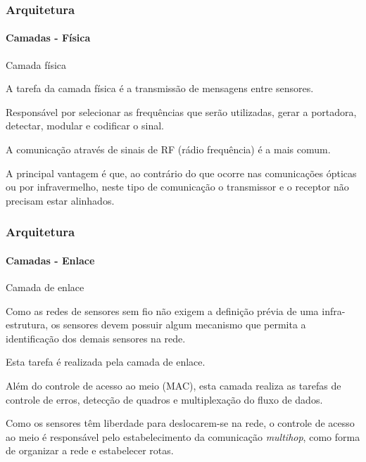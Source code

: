 \documentclass[notes]{beamer}
\begin{document}
\begin{frame}
\label{slide_42}
\frametitle{Arquitetura}
\framesubtitle{Camadas - Física}

\begin{block}{Camada física}

A tarefa da camada física é a transmissão de mensagens entre sensores.

\end{block} \pause

\begin{block}

Responsável por selecionar as frequências que serão utilizadas, gerar a portadora, detectar, modular e codificar o sinal. 

\end{block} \pause

\begin{block}

A comunicação através de sinais de RF (rádio frequência) é a mais comum. 
\end{block} \pause

\begin{block}

A principal vantagem é que, ao contrário do que ocorre nas comunicações ópticas ou por infravermelho, neste tipo de comunicação o transmissor e o receptor não precisam estar alinhados.

\end{block}

\end{frame}

\begin{frame}
\label{slide_43}
\frametitle{Arquitetura}
\framesubtitle{Camadas - Enlace}

\begin{block}{Camada de enlace}

Como as redes de sensores sem fio não exigem a definição prévia de uma infra-estrutura, os sensores devem possuir algum mecanismo que permita a identificação dos demais sensores na rede. 
\end{block} \pause

\begin{block}

Esta tarefa é realizada pela camada de enlace.

\end{block} \pause

\begin{block}

Além do controle de acesso ao meio (MAC), esta camada realiza as tarefas de controle de erros, detecção de quadros e multiplexação do fluxo de dados.

\end{block} \pause

\begin{block}

Como os sensores têm liberdade para deslocarem-se na rede, o controle de acesso ao meio é responsável pelo estabelecimento da comunicação \textit{multihop}, como forma de organizar a rede e estabelecer rotas.

\end{block}

\end{frame}
\end{document}

